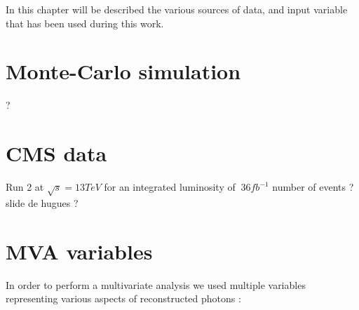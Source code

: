 \label{sec:unchapitre}

In this chapter will be described the various sources of data, and input variable that has been used during this work.

\section{Monte-Carlo simulation}

?

\section{CMS data}

Run 2 at $\sqrt{s} = 13 TeV$ for an integrated luminosity of $~ 36 fb^{-1}$
number of events ? slide de hugues ?

\section{MVA variables}

In order to perform a multivariate analysis we used multiple variables representing various aspects of reconstructed
photons :

